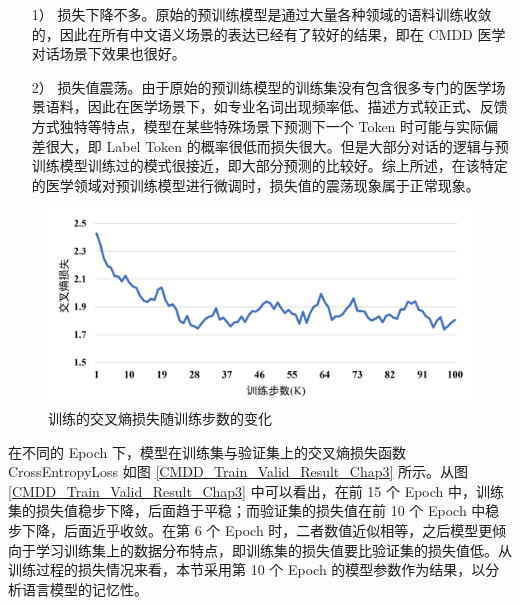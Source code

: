 \begin{itemize}
	\item [1）]
	损失下降不多。原始的预训练模型是通过大量各种领域的语料训练收敛的，因此在所有中文语义场景的表达已经有了较好的结果，即在 CMDD 医学对话场景下效果也很好。
	\item [2）]
	损失值震荡。由于原始的预训练模型的训练集没有包含很多专门的医学场景语料，因此在医学场景下，如专业名词出现频率低、描述方式较正式、反馈方式独特等特点，模型在某些特殊场景下预测下一个 Token 时可能与实际偏差很大，即 Label Token 的概率很低而损失很大。但是大部分对话的逻辑与预训练模型训练过的模式很接近，即大部分预测的比较好。综上所述，在该特定的医学领域对预训练模型进行微调时，损失值的震荡现象属于正常现象。
\end{itemize}

\begin{figure}[h]
	\centering
	\includegraphics[width=\linewidth]{figures/Chap3_train_loss.png}
	\caption{训练的交叉熵损失随训练步数的变化}
	\label{Chap3_train_loss}
\end{figure}



在不同的 Epoch 下，模型在训练集与验证集上的交叉熵损失函数 CrossEntropyLoss 如图 \ref{CMDD_Train_Valid_Result_Chap3} 所示。从图 \ref{CMDD_Train_Valid_Result_Chap3} 中可以看出，在前 15 个 Epoch 中，训练集的损失值稳步下降，后面趋于平稳；而验证集的损失值在前 10 个 Epoch 中稳步下降，后面近乎收敛。在第 6 个 Epoch 时，二者数值近似相等，之后模型更倾向于学习训练集上的数据分布特点，即训练集的损失值要比验证集的损失值低。从训练过程的损失情况来看，本节采用第 10 个 Epoch 的模型参数作为结果，以分析语言模型的记忆性。

